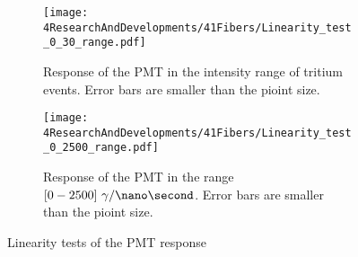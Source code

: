 \begin{figure}
\centering
    \begin{subfigure}[b]{1\textwidth}
    \centering
    \texttt{[image: 4ResearchAndDevelopments/41Fibers/Linearity\_test\_0\_30\_range.pdf]}  
    \caption{Response of the PMT in the intensity range of tritium events. Error bars are smaller than the pioint size. \label{subfig:LinearityTritiumRange}}
    \end{subfigure}
    \hfill
    \begin{subfigure}[b]{1\textwidth}
    \centering
    \texttt{[image: 4ResearchAndDevelopments/41Fibers/Linearity\_test\_0\_2500\_range.pdf]}  
    \caption{Response of the PMT in the range $[0-2500]~\gamma/\nano\second$. Error bars are smaller than the pioint size. \label{subfig:LinearityStudyRange}}
    \end{subfigure}
 \caption{Linearity tests of the PMT response}
 \label{fig:LinearityRangesOfPMT}
\end{figure}